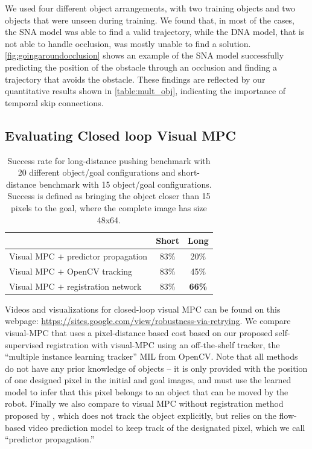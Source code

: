 We used four different object arrangements, with two training objects and two objects that were unseen during training. We found that, in most of the cases, the SNA model was able to find a valid trajectory, while the DNA model, that is not able to handle occlusion, was mostly unable to find a solution. \autoref{fig:goingaroundocclusion} shows an example of the SNA model successfully predicting the position of the obstacle through an occlusion and finding a trajectory that avoids the obstacle. These findings are reflected by our quantitative results shown in \autoref{table:mult_obj}, indicating the importance of temporal skip connections.

\subsection{Evaluating Closed loop Visual MPC}

\begin{table}
	{\footnotesize
		\begin{center}
			\begin{tabular}{lcc}
				\toprule
				& Short & Long \\
				\midrule
				Visual MPC $+$ predictor propagation  & 83\% & 20\% \\
				Visual MPC $+$ OpenCV tracking  & 83\%  & 45\% \\
				Visual MPC $+$ registration network & 83\% & \textbf{66\%}  \\
				\bottomrule
			\end{tabular}
		\end{center}
	}
	\caption{\small Success rate for long-distance pushing benchmark with 20 different object/goal configurations and short-distance benchmark with 15 object/goal configurations. Success is defined as bringing the object closer than 15 pixels to the goal, where the complete image has size 48x64.}
	\label{table:res_long_short}
\end{table}

Videos and visualizations for closed-loop visual MPC can be found on this webpage: \url{https://sites.google.com/view/robustness-via-retrying}. We compare visual-MPC that uses a pixel-distance based cost based on our proposed self-supervised registration with visual-MPC using an off-the-shelf tracker, the ``multiple instance learning tracker'' MIL \cite{babenko2009visual} from OpenCV. Note that all methods do not have any prior knowledge of objects -- it is only provided with the position of one designed pixel in the initial and goal images, and must use the learned model to infer that this pixel belongs to an object that can be moved by the robot. Finally we also compare to visual MPC without registration method proposed by \cite{sna}, which does not track the object explicitly, but relies on the flow-based video prediction model to keep track of the designated pixel, which we call ``predictor propagation.'' 

